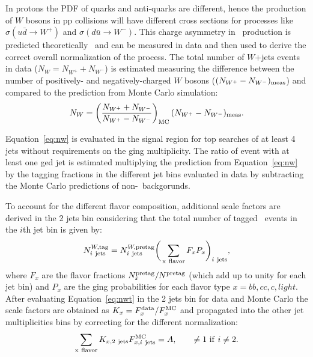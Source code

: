 In protons the PDF of quarks and anti-quarks are different, hence 
the production of $W$ bosons in pp collisions will have different 
cross sections for processes like
$\sigma(u\bar{d}\to W^+)$ and $\sigma(d\bar{u}\to W^-)$. This charge
asymmetry in \wjets\ production is predicted theoretically~\cite{wasym}
and can be measured in data and then used to derive the correct
overall normalization of the process.
The total number of $W$+jets events in data ($N_W=N_{W^+}+N_{W^-}$) 
is estimated measuring the difference between the number 
of positively- and negatively-charged $W$
bosons ($(N_{W^+}-N_{W^-})_{\rm meas}$) 
and compared to the prediction from Monte Carlo simulation:
\begin{equation}
N_W = \left(\frac{N_{W^+}+N_{W^-}}{N_{W^+}-N_{W^-}}\right )_{\rm MC}(N_{W^+}-N_{W^-})_{\rm meas}.
\label{eq:nw}
\end{equation}

Equation~\ref{eq:nw} is evaluated in the signal region for top searches
of at least 4 jets without requirements on the \btag ging multiplicity.
The ratio of event with at least one \btag ged jet is estimated multiplying
the prediction from Equation~\ref{eq:nw} by the tagging fractions in the different
jet bins evaluated in data by subtracting the Monte Carlo predictions of
non-\wjets\ backgorunds.

To account for the different flavor composition, additional scale factors
are derived in the 2 jets bin considering that the total number of tagged \wjets\ 
events in the $i$th jet bin is given by:
\begin{equation}\label{eq:nwt}
N^{W,{\rm tag}}_{i\ {\rm jets}}  = N^{W,{\rm pretag}}_{i\ {\rm jets}}\bigg(\sum_{\rm x\ flavor} F_{x}P_{x}\bigg)_{i\ {\rm jets}},
\end{equation}
where $F_x$ are the flavor fractions $N^{\rm pretag}_x/N^{\rm pretag}$ 
(which add up to unity for each jet bin) and 
$P_x$ are the \btag ging probabilities for each flavor type $x = bb, cc, c, light$.
After evaluating Equation~\ref{eq:nwt} in the 2 jets bin for data
and Monte Carlo the scale factors
are obtained as $K_x = F^{\rm data}_x/F^{\rm MC}_x$ and 
propagated into the other jet multiplicities bins by correcting
for the different normalization:
\begin{equation}\label{eq:sfwn}
\sum_{\rm x\ flavor} K_{x, {\rm 2\ jets}} F_{x, i\ {\rm jets}}^{\rm MC} = A, \qquad \neq 1 {\rm\ if\ } i \neq 2.
	\end{equation}





